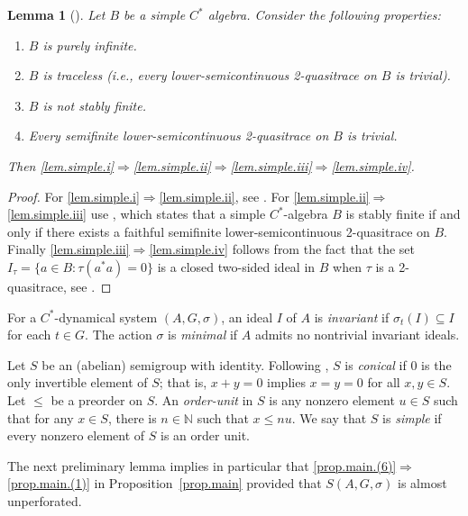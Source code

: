 \documentclass[a4paper, 12pt]{amsart}
\numberwithin{equation}{section}
\newcounter{theorem}
\newtheorem{lemma}[theorem]{Lemma}
\theoremstyle{remark}
\theoremstyle{definition}
\begin{document}
\begin{lemma}[{\cite{MR2032998}}]\label{lem.simple}
Let $B$ be a simple $C^*$ algebra. Consider the following properties:
\begin{enumerate}
\item\label{lem.simple.i} $B$ is purely infinite.
\item\label{lem.simple.ii} $B$ is traceless (i.e., every lower-semicontinuous 2-quasitrace on $B$ is trivial).
\item\label{lem.simple.iii} $B$ is not stably finite.
\item\label{lem.simple.iv} Every \emph{semifinite} lower-semicontinuous 2-quasitrace on $B$ is trivial.
\end{enumerate}
Then \eqref{lem.simple.i}$\Rightarrow$\eqref{lem.simple.ii}$\Rightarrow$\eqref{lem.simple.iii}$\Rightarrow$\eqref{lem.simple.iv}.
\end{lemma}
\begin{proof}
For \eqref{lem.simple.i}$\Rightarrow$\eqref{lem.simple.ii}, see \cite[Proposition~4.1]{MR2032998}. For
\eqref{lem.simple.ii}$\Rightarrow$\eqref{lem.simple.iii} use \cite[Remark 2.27(viii)]{MR2032998}, which states that a
simple $C^*$-algebra $B$ is stably finite if and only if there exists a faithful
semifinite lower-semicontinuous 2-quasitrace on $B$. Finally \eqref{lem.simple.iii}$\Rightarrow$\eqref{lem.simple.iv}
follows from the fact that the set $I_\tau=\{a\in B : \tau(a^*a)=0\}$ is a closed
two-sided ideal in $B$ when $\tau$ is a 2-quasitrace, see \cite[Remark
2.27(vi)]{MR2032998}.
\end{proof}

For a $C^*$-dynamical system $(A,G,\sigma)$, an ideal $I$ of $A$ is \emph{invariant} if
$\sigma_t(I)\subseteq I$ for each $t\in G$. The action $\sigma$ is \emph{minimal} if $A$
admits no nontrivial invariant ideals.

Let $S$ be an (abelian) semigroup with identity. Following \cite{MR3369375, MR2806681},
$S$ is \emph{conical} if 0 is the only invertible element of $S$; that is, $x + y = 0$
implies $x = y = 0$ for all $x,y \in S$. Let $\leq$ be a preorder on $S$. An
\emph{order-unit} in $S$ is any nonzero element $u \in S$ such that for any $x \in S$,
there is $n \in {\mathbb{N}}$ such that $x \leq nu$. We say that $S$ is \emph{simple} if every
nonzero element of $S$ is an order unit.

The next preliminary lemma implies in particular that \eqref{prop.main.(6)}$\Rightarrow$\eqref{prop.main.(1)} in
Proposition~\ref{prop.main} provided that $S(A, G, \sigma)$ is almost unperforated.
\end{document}
